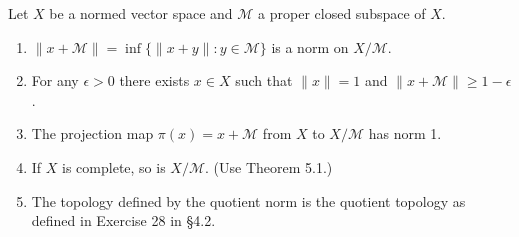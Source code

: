 \documentclass[12pt,a4paper]{article}
\begin{document}
\begin{problem}\label{prob:5-12}
Let $X$ be a normed vector space and $\mathcal{M}$ a proper closed subspace of $X$.
\begin{enumerate}[label=\alph*.]
\item $\|x+\mathcal{M}\| = \inf \{ \|x+y\| : y \in \mathcal{M} \}$ is a norm on $X/\mathcal{M}$.
\item For any $\epsilon > 0$ there exists $x \in X$ such that $\|x\|=1$ and $\|x+\mathcal{M}\| \ge 1-\epsilon$.
\item The projection map $\pi(x) = x+\mathcal{M}$ from $X$ to $X/\mathcal{M}$ has norm 1.
\item If $X$ is complete, so is $X/\mathcal{M}$. (Use Theorem 5.1.)
\item The topology defined by the quotient norm is the quotient topology as defined in Exercise 28 in \S4.2.
\end{enumerate}
\end{problem}
\end{document}

